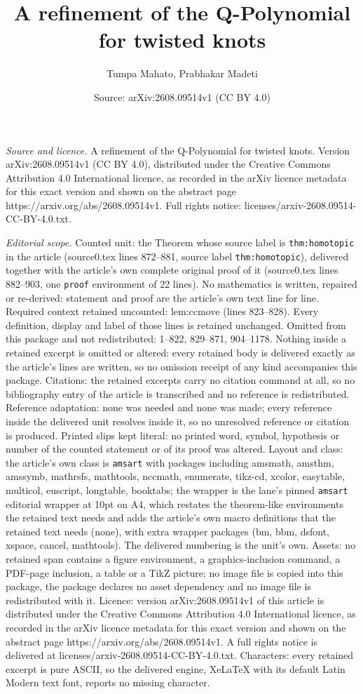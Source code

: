 \documentclass[10pt,a4paper]{amsart}
\title[A refinement of the Q-Polynomial for twisted knots]{A refinement of the Q-Polynomial for twisted knots}
\author{Tumpa Mahato, Prabhakar Madeti}
\date{Source: arXiv:2608.09514v1 (CC BY 4.0)}
\begin{document}
\maketitle

\noindent\emph{Source and licence.} A refinement of the Q-Polynomial for twisted knots. Version arXiv:2608.09514v1 (CC BY 4.0), distributed under the Creative Commons Attribution 4.0 International licence, as recorded in the arXiv licence metadata for this exact version and shown on the abstract page https://arxiv.org/abs/2608.09514v1. Full rights notice: licenses/arxiv-2608.09514-CC-BY-4.0.txt.\par\smallskip

\noindent\textit{Editorial scope.} Counted unit: the Theorem whose source label is \texttt{thm:homotopic} in the article (source0.tex lines 872--881, source label \texttt{thm:homotopic}), delivered together with the article's own complete original proof of it (source0.tex lines 882--903, one \texttt{proof} environment of 22 lines). No mathematics is written, repaired or re-derived: statement and proof are the article's own text line for line. Required context retained uncounted: lem:ccmove (lines 823--828). Every definition, display and label of those lines is retained unchanged. Omitted from this package and not redistributed: 1--822, 829--871, 904--1178. Nothing inside a retained excerpt is omitted or altered: every retained body is delivered exactly as the article's lines are written, so no omission receipt of any kind accompanies this package. Citations: the retained excerpts carry no citation command at all, so no bibliography entry of the article is transcribed and no reference is redistributed. Reference adaptation: none was needed and none was made; every reference inside the delivered unit resolves inside it, so no unresolved reference or citation is produced. Printed slips kept literal: no printed word, symbol, hypothesis or number of the counted statement or of its proof was altered. Layout and class: the article's own class is \texttt{amsart} with packages including amsmath, amsthm, amssymb, mathrsfs, mathtools, nccmath, enumerate, tikz-cd, xcolor, easytable, multicol, euscript, longtable, booktabs; the wrapper is the lane's pinned \texttt{amsart} editorial wrapper at 10pt on A4, which restates the theorem-like environments the retained text needs and adds the article's own macro definitions that the retained text needs (none), with extra wrapper packages (bm, bbm, dsfont, xspace, cancel, mathtools). The delivered numbering is the unit's own. Assets: no retained span contains a figure environment, a graphics-inclusion command, a PDF-page inclusion, a table or a TikZ picture; no image file is copied into this package, the package declares no asset dependency and no image file is redistributed with it. Licence: version arXiv:2608.09514v1 of this article is distributed under the Creative Commons Attribution 4.0 International licence, as recorded in the arXiv licence metadata for this exact version and shown on the abstract page https://arxiv.org/abs/2608.09514v1. A full rights notice is delivered at licenses/arxiv-2608.09514-CC-BY-4.0.txt. Characters: every retained excerpt is pure ASCII, so the delivered engine, XeLaTeX with its default Latin Modern text font, reports no missing character.
\end{document}
